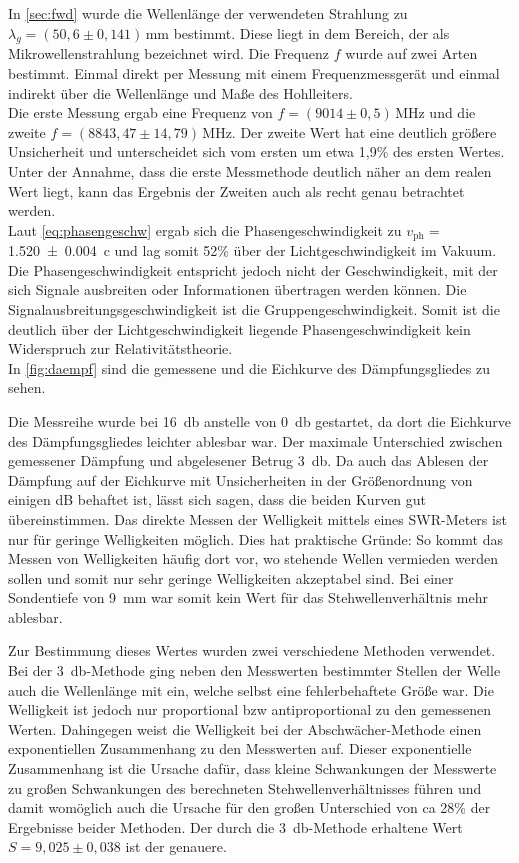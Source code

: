In \autoref{sec:fwd} wurde die Wellenlänge der verwendeten Strahlung zu $\lambda_g = (50,6 \pm 0,141)$\,mm bestimmt. Diese liegt in dem Bereich, der als Mikrowellenstrahlung bezeichnet wird.
Die Frequenz $f$ wurde auf zwei Arten bestimmt. Einmal direkt per Messung mit einem Frequenzmessgerät und einmal indirekt über die Wellenlänge und Maße des Hohlleiters.\\
Die erste Messung ergab eine Frequenz von $f = (9014 \pm 0,5)$\,MHz und die zweite $f = (8843,47 \pm 14,79)$\,MHz.
Der zweite Wert hat eine deutlich größere Unsicherheit und unterscheidet sich vom ersten um etwa 1,9\% des ersten Wertes.
Unter der Annahme, dass die erste Messmethode deutlich näher an dem realen Wert liegt, kann das Ergebnis der Zweiten auch als recht genau betrachtet werden.\\
Laut \autoref{eq:phasengeschw} ergab sich die Phasengeschwindigkeit zu $v_\text{ph} =$ \SI{1,520\pm0,004}{c} und lag somit 52\% über der Lichtgeschwindigkeit im Vakuum. 
Die Phasengeschwindigkeit entspricht jedoch nicht der Geschwindigkeit, mit der sich Signale ausbreiten oder Informationen übertragen werden können.
Die Signalausbreitungsgeschwindigkeit ist die Gruppengeschwindigkeit.
Somit ist die deutlich über der Lichtgeschwindigkeit liegende Phasengeschwindigkeit kein Widerspruch zur Relativitätstheorie.\\



In \autoref{fig:daempf} sind die gemessene und die Eichkurve des Dämpfungsgliedes zu sehen. 

Die Messreihe wurde bei \SI{16}{\decibel} anstelle von \SI{0}{\decibel} gestartet, da dort die Eichkurve des Dämpfungsgliedes leichter ablesbar war.
Der maximale Unterschied zwischen gemessener Dämpfung und abgelesener Betrug \SI{3}{\decibel}.
Da auch das Ablesen der Dämpfung auf der Eichkurve mit Unsicherheiten in der Größenordnung von einigen dB behaftet ist, lässt sich sagen, dass die beiden Kurven gut übereinstimmen.
Das direkte Messen der Welligkeit mittels eines SWR-Meters ist nur  für geringe Welligkeiten möglich.
Dies hat praktische Gründe:
So kommt das Messen von Welligkeiten häufig dort vor, wo stehende Wellen vermieden werden sollen und somit nur sehr geringe Welligkeiten akzeptabel sind.
Bei einer Sondentiefe von \SI{9}{\milli\metre} war somit kein Wert für das Stehwellenverhältnis mehr ablesbar.

Zur Bestimmung dieses Wertes wurden zwei verschiedene Methoden verwendet.
Bei der \SI{3}{\decibel}-Methode ging neben den Messwerten bestimmter Stellen der Welle auch die Wellenlänge mit ein, welche selbst eine fehlerbehaftete Größe war.
Die Welligkeit ist jedoch nur proportional bzw antiproportional zu den gemessenen Werten.
Dahingegen weist die Welligkeit bei der Abschwächer-Methode einen exponentiellen Zusammenhang zu den Messwerten auf.
Dieser exponentielle Zusammenhang ist die Ursache dafür, dass kleine Schwankungen der Messwerte zu großen Schwankungen des berechneten Stehwellenverhältnisses führen und damit womöglich auch die Ursache für den großen Unterschied von ca 28\% der Ergebnisse beider Methoden.
Der durch die \SI{3}{\decibel}-Methode erhaltene Wert $S = 9,025 \pm 0,038$ ist der genauere.

